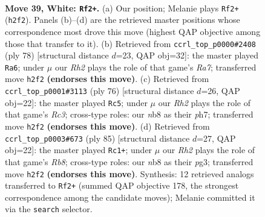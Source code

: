 \documentclass[11pt]{article}
\begin{document}
\clearpage

\begin{figure}[p]\centering
\begin{subfigure}{0.46\textwidth}\centering
\resizebox{\linewidth}{!}{%
\newchessgame
\chessboard[
  setfen={1n5r/5k2/1p1p4/1P1P4/p1p3P1/7P/1P5R/2K5 w - - 7 39},
  showmover=false,
  pgfstyle=straightmove, color=movearrow, markmove={h2-f2}
]}
\caption{}
\end{subfigure}\hfill
\begin{subfigure}{0.46\textwidth}\centering
\resizebox{\linewidth}{!}{%
\newchessgame
\chessboard[
  setfen={5k2/R7/4p1p1/4P2p/1p6/1P5P/P1r3PK/8 w - - 0 40},
  showmover=false,
  pgfstyle=straightmove, color=movearrow, markmove={a7-a6}
]}
\caption{}
\end{subfigure}
\\[4pt]
\begin{subfigure}{0.46\textwidth}\centering
\resizebox{\linewidth}{!}{%
\newchessgame
\chessboard[
  setfen={1r2k3/7p/5pp1/p3p3/P7/1PR4P/4KPP1/8 w - - 0 39},
  showmover=false,
  pgfstyle=straightmove, color=movearrow, markmove={c3-c5}
]}
\caption{}
\end{subfigure}\hfill
\begin{subfigure}{0.46\textwidth}\centering
\resizebox{\linewidth}{!}{%
\newchessgame
\chessboard[
  setfen={1R6/5pk1/1p5p/6p1/P7/2K3PP/5P2/1r6 b - - 9 43},
  showmover=false,
  pgfstyle=straightmove, color=movearrow, markmove={b1-c1}
]}
\caption{}
\end{subfigure}
\caption{\textbf{Move 39, White: \texttt{Rf2+}.} (a) Our position; Melanie plays \texttt{Rf2+} (\texttt{h2f2}). Panels (b)--(d) are the retrieved master positions whose correspondence most drove this move (highest QAP objective among those that transfer to it). (b) Retrieved from \texttt{ccrl\_top\_p0000\#2408} (ply 78) [structural distance $d$=23, QAP obj=32]: the master played \texttt{Ra6}; under $\mu$ our \emph{Rh2} plays the role of that game's \emph{Ra7}; transferred move \texttt{h2f2} \textbf{(endorses this move)}. (c) Retrieved from \texttt{ccrl\_top\_p0001\#3113} (ply 76) [structural distance $d$=26, QAP obj=22]: the master played \texttt{Rc5}; under $\mu$ our \emph{Rh2} plays the role of that game's \emph{Rc3}; cross-type roles: our \emph{n}b8 as their \emph{p}h7; transferred move \texttt{h2f2} \textbf{(endorses this move)}. (d) Retrieved from \texttt{ccrl\_top\_p0003\#673} (ply 85) [structural distance $d$=27, QAP obj=22]: the master played \texttt{Rc1+}; under $\mu$ our \emph{Rh2} plays the role of that game's \emph{Rb8}; cross-type roles: our \emph{n}b8 as their \emph{p}g3; transferred move \texttt{h2f2} \textbf{(endorses this move)}. Synthesis: 12 retrieved analogs transferred to \texttt{Rf2+} (summed QAP objective 178, the strongest correspondence among the candidate moves); Melanie committed it via the \texttt{search} selector.}
\label{fig:thought-m76}
\end{figure}
\end{document}
